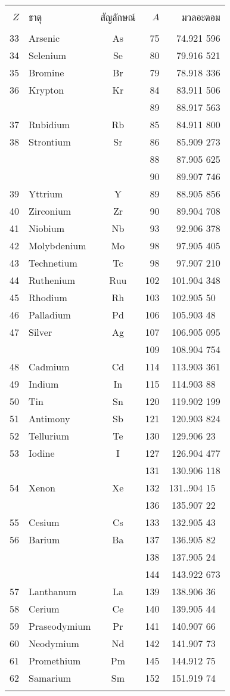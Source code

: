 \begin{tabular}{rlcrr}
\hline\\
$Z$&ธาตุ&สัญลักษณ์&$A$&มวลอะตอม\\
\hline\\
33&Arsenic&As&75&74.921 596\\
34&Selenium&Se&80&79.916 521\\
35&Bromine&Br&79&78.918 336\\
36&Krypton&Kr&84&83.911 506\\
&&&89&88.917 563\\
37&Rubidium&Rb&85&84.911 800\\
38&Strontium&Sr&86&85.909 273\\
&&&88&87.905 625\\
&&&90&89.907 746\\
39&Yttrium&Y&89&88.905 856\\
40&Zirconium&Zr&90&89.904 708\\
41&Niobium&Nb&93&92.906 378\\
42&Molybdenium&Mo&98&97.905 405\\
43&Technetium&Tc&98&97.907 210\\
44&Ruthenium&Ruu&102&101.904 348\\
45&Rhodium&Rh&103&102.905 50\mbox{ }\\
46&Palladium&Pd&106&105.903 48\mbox{ }\\
47&Silver&Ag&107&106.905 095\\
&&&109&108.904 754\\
48&Cadmium&Cd&114&113.903 361\\
49&Indium&In&115&114.903 88\mbox{ }\\
50&Tin&Sn&120&119.902 199\\
51&Antimony&Sb&121&120.903 824\\
52&Tellurium&Te&130&129.906 23\mbox{ }\\
53&Iodine&I&127&126.904 477\\
&&&131&130.906 118\\
54&Xenon&Xe&132&131..904 15\mbox{ }\\
&&&136&135.907 22\mbox{ }\\
55&Cesium&Cs&133&132.905 43\mbox{ }\\
56&Barium&Ba&137&136.905 82\mbox{ }\\
&&&138&137.905 24\mbox{ }\\
&&&144&143.922 673\\
57&Lanthanum&La&139&138.906 36\mbox{ }\\
58&Cerium&Ce&140&139.905 44\mbox{ }\\
59&Praseodymium&Pr&141&140.907 66\mbox{ }\\
60&Neodymium&Nd&142&141.907 73\mbox{ }\\
61&Promethium&Pm&145&144.912 75\mbox{ }\\
62&Samarium&Sm&152&151.919 74\mbox{ }\\\\
\hline
\end{tabular}


